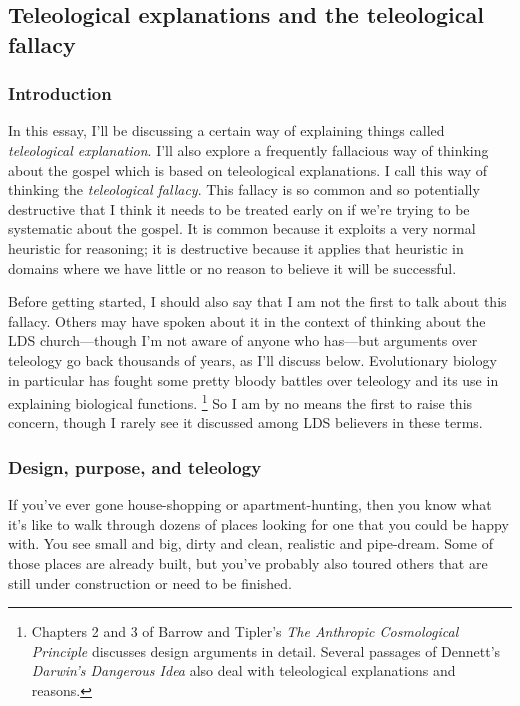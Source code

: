 \subsection{Teleological explanations and the teleological fallacy}

	\subsubsection{Introduction}

		In this essay, I'll be discussing a certain way of explaining things called \textit{teleological explanation}. I'll also explore a frequently fallacious way of thinking about the gospel which is based on teleological explanations. I call this way of thinking the \textit{teleological fallacy}. This fallacy is so common and so potentially destructive that I think it needs to be treated early on if we're trying to be systematic about the gospel. It is common because it exploits a very normal heuristic for reasoning; it is destructive because it applies that heuristic in domains where we have little or no reason to believe it will be successful.

		Before getting started, I should also say that I am not the first to talk about this fallacy. Others may have spoken about it in the context of thinking about the LDS church---though I'm not aware of anyone who has---but arguments over teleology go back thousands of years, as I'll discuss below. Evolutionary biology in particular has fought some pretty bloody battles over teleology and its use in explaining biological functions.%
			\footnote{Chapters 2 and 3 of Barrow and Tipler's \textit{The Anthropic Cosmological Principle} discusses design arguments in detail. Several passages of Dennett's \textit{Darwin's Dangerous Idea} also deal with teleological explanations and reasons.}
		So I am by no means the first to raise this concern, though I rarely see it discussed among LDS believers in these terms.
	
	\subsubsection{Design, purpose, and teleology}
	
		If you've ever gone house-shopping or apartment-hunting, then you know what it's like to walk through dozens of places looking for one that you could be happy with. You see small and big, dirty and clean, realistic and pipe-dream. Some of those places are already built, but you've probably also toured others that are still under construction or need to be finished.
		
